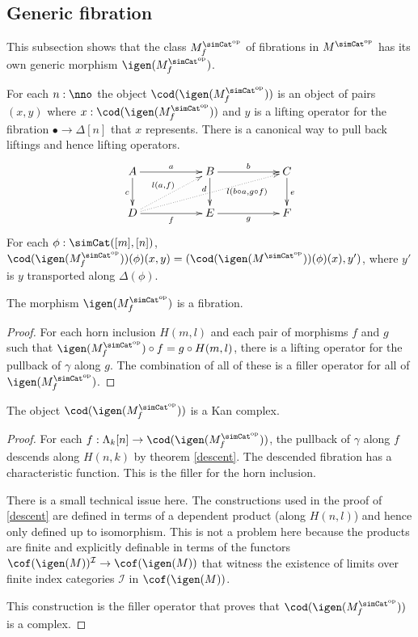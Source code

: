 \documentclass{tac}
\newcommand\cat\mathcal
\newcommand\dual{^{\mathrm{op}}}
\newcommand\s{^{\simCat\dual}}
\newcommand\of{:}
\newcommand\simplex\Delta
\newcommand\horn\Lambda
\newcommand\f{_f}
\newcommand\gen\gamma
\begin{document}
\subsection{Generic fibration}

This subsection shows that the class $M\s\f$ of fibrations in $M\s$ has its own generic morphism $\igen(M\s\f)$.

\begin{definition}
For each $n\of\nno$ the object $\cod(\igen(M\s\f))$ is an object of pairs $(x,y)$ where $x\of \cod(\igen(M\s\f))$ and $y$ is a lifting operator for the fibration $\bullet\to\simplex[n]$ that $x$ represents. There is a canonical way to pull back liftings and hence lifting operators.
\[\xymatrix{
A\ar[rr]^a\ar[d]_c && B \ar[rr]^b\ar[d]_(.4)d && C\ar[d]^e\\
D\ar[rr]_f \ar@{.>}[urrrr]_(.7){l(b\circ a, g\circ f)}\ar@{.>}[urr]^{l(a, f)} && E \ar[rr]_g && F
}\]
For each $\phi\of \simCat([m],[n])$, $\cod(\igen(M\s\f))(\phi)(x,y) = (\cod(\igen(M\s))(\phi)(x),y')$, where $y'$ is $y$ transported along $\simplex(\phi)$.
\end{definition}


\begin{lemma} The morphism $\igen(M\s\f)$ is a fibration. \end{lemma}

\begin{proof} For each horn inclusion $H(m,l)$ and each pair of morphisms $f$ and $g$ such that $\igen(M\s\f)\circ f=g\circ H(m,l)$, there is a lifting operator for the pullback of $\gen$ along $g$. The combination of all of these is a filler operator for all of $\igen(M\s\f)$.
\end{proof}


\begin{lemma} The object $\cod(\igen(M\s\f))$ is a Kan complex. \end{lemma}

\begin{proof} For each $f\of\horn_k[n]\to \cod(\igen(M\s\f))$, the pullback of $\gen$ along $f$ descends along $H(n,k)$ by theorem \ref{descent}. The descended fibration has a characteristic function. This is the filler for the horn inclusion. %

There is a small technical issue here. The constructions used in the proof of \ref{descent} are defined in terms of a dependent product (along $H(n,l)$) and hence only defined up to isomorphism. This is not a problem here because the products are finite and explicitly definable in terms of the functors $\cof(\igen(M))^\cat I \to \cof(\igen(M))$ that witness the existence of limits over finite index categories $\cat I$ in $\cof(\igen(M))$.

This construction is the filler operator that proves that $\cod(\igen(M\s\f))$ is a complex.
\end{proof}
\end{document}
